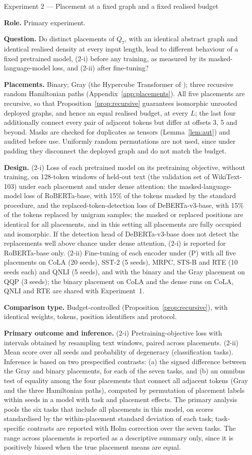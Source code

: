 \documentclass[10pt]{article}
\newcommand{\cardfield}[1]{\par\smallskip\noindent\textbf{#1.}\enspace}
\begin{document}
\begin{expcard}{Experiment 2 --- Placement at a fixed graph and a fixed realised budget}
\cardfield{Role} Primary experiment.
\cardfield{Question} Do distinct placements of $Q_7$, with an identical abstract graph and identical realised density at every input length, lead to different behaviour of a fixed pretrained model, (2-i) before any training, as measured by its masked-language-model loss, and (2-ii) after fine-tuning?
\cardfield{Placements} Binary; Gray (the Hypercube Transformer of \citealp{wang2022dense}); three recursive random Hamiltonian paths (Appendix~\ref{app:placements}). All five placements are recursive, so that Proposition~\ref{prop:recursive} guarantees isomorphic unrooted deployed graphs, and hence an equal realised budget, at every $L$; the last four additionally connect every pair of adjacent tokens but differ at offsets 3, 5 and beyond. Masks are checked for duplicates as tensors (Lemma~\ref{lem:aut}) and audited before use. Uniformly random permutations are not used, since under padding they disconnect the deployed graph and do not match the budget.
\cardfield{Design} (2-i) Loss of each pretrained model on its pretraining objective, without training, on 128-token windows of held-out text (the validation set of WikiText-103) under each placement and under dense attention: the masked-language-model loss of RoBERTa-base, with 15\% of the tokens masked by the standard procedure, and the replaced-token-detection loss of DeBERTa-v3-base, with 15\% of the tokens replaced by unigram samples; the masked or replaced positions are identical for all placements, and in this setting all placements are fully occupied and isomorphic. If the detection head of DeBERTa-v3-base does not detect the replacements well above chance under dense attention, (2-i) is reported for RoBERTa-base only. (2-ii) Fine-tuning of each encoder under (P) with all five placements on CoLA (20 seeds), SST-2 (5 seeds), MRPC, STS-B and RTE (10 seeds each) and QNLI (5 seeds), and with the binary and the Gray placement on QQP (3 seeds); the binary placement on CoLA and the dense runs on CoLA, QNLI and RTE are shared with Experiment~1.
\cardfield{Comparison type} Budget-controlled (Proposition~\ref{prop:recursive}), with identical weights, tokens, position identifiers and protocol.
\cardfield{Primary outcome and inference} (2-i) Pretraining-objective loss with intervals obtained by resampling text windows, paired across placements. (2-ii) Mean score over all seeds and probability of degeneracy (classification tasks). Inference is based on two prespecified contrasts: (a) the signed difference between the Gray and binary placements, for each of the seven tasks, and (b) an omnibus test of equality among the four placements that connect all adjacent tokens (Gray and the three Hamiltonian paths), computed by permutation of placement labels within seeds in a model with task and placement effects. The primary analysis pools the six tasks that include all placements in this model, on scores standardised by the within-placement standard deviation of each task; task-specific contrasts are reported with Holm correction over the seven tasks. The range across placements is reported as a descriptive summary only, since it is positively biased when the true placement means are equal.

\end{expcard}
\end{document}
